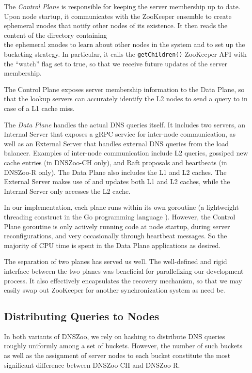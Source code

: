 \documentclass[format=sigconf,nonacm,screen]{acmart}
\newcommand{\dnszoo}{\textsf{DNSZoo}}
\newcommand{\dnszooch}{\textsf{DNSZoo-CH}}
\newcommand{\dnszoor}{\textsf{DNSZoo-R}}
\begin{document}
The \emph{Control Plane} is responsible for keeping the server membership up to date. Upon node startup, it communicates with the ZooKeeper ensemble to create ephemeral znodes that notify other nodes of its existence. It then reads the content of the directory containing \\
the ephemeral znodes to learn about other nodes in the system and to set up the bucketing strategy. In particular, it calls the \texttt{getChildren()} ZooKeeper API with the ``watch'' flag set to true, so that we receive future updates of the server membership.

The Control Plane exposes server membership information to the Data Plane, so that the lookup servers can accurately identify the L2 nodes to send a query to in case of a L1 cache miss.

The \emph{Data Plane} handles the actual DNS queries itself. It includes two servers, an Internal Server that exposes a gRPC service for inter-node communication, as well as an External Server that handles external DNS queries from the load balancer. Examples of inter-node communication include L2 queries, gossiped new cache entries (in \dnszooch{} only), and Raft proposals and heartbeats (in \dnszoor{} only). The Data Plane also includes the L1 and L2 caches. The External Server makes use of and updates both L1 and L2 caches, while the Internal Server only accesses the L2 cache.

In our implementation, each plane runs within its own goroutine (a lightweight threading construct in the Go programming language \cite{go}). However, the Control Plane goroutine is only actively running code at node startup, during server reconfigurations, and very occasionally through heartbeat messages. So the majority of CPU time is spent in the Data Plane applications as desired.

The separation of two planes has served us well. The well-defined and rigid interface between the two planes was beneficial for parallelizing our development process. It also effectively encapsulates the recovery mechanism, so that we may easily swap out ZooKeeper for another synchronization system as need be.

\subsection{Distributing Queries to Nodes} \label{sec:distribute-queries}
In both variants of \dnszoo{}, we rely on hashing to distribute DNS queries roughly uniformly among a set of buckets. However, the number of such buckets as well as the assignment of server nodes to each bucket constitute the most significant difference between \dnszooch{} and \dnszoor{}.
\end{document}
